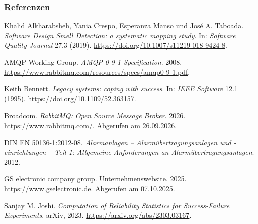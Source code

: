 \documentclass[11pt,aspectratio=1610]{beamer} %
\begin{document}
\begin{frame}
    \frametitle{Referenzen}
    \fontsize{7pt}{8pt}\selectfont
    \begin{reflist}
        \hypertarget{Alk19}{}
        \item[{[Alk19]}] Khalid Alkharabsheh, Yania Crespo, Esperanza Manso und José A. Taboada. \textit{Software Design Smell Detection: a systematic mapping study}. In: \textit{Software Quality Journal} 27.3 (2019). \url{https://doi.org/10.1007/s11219-018-9424-8}.

        \hypertarget{AMQ08}{}
        \item[{[AMQ08]}] AMQP Working Group. \textit{AMQP 0-9-1 Specification}. 2008. \url{https://www.rabbitmq.com/resources/specs/amqp0-9-1.pdf}.

        \hypertarget{Ben95}{}
        \item[{[Ben95]}] Keith Bennett. \textit{Legacy systems: coping with success}. In: \textit{IEEE Software} 12.1 (1995). \url{https://doi.org/10.1109/52.363157}.

        \hypertarget{Bro26}{}
        \item[{[Bro26]}] Broadcom. \textit{RabbitMQ: Open Source Message Broker}. 2026. \url{https://www.rabbitmq.com/}. Abgerufen am 26.09.2026.

        \hypertarget{DIN12}{}
        \item[{[DIN12]}] DIN EN 50136-1:2012-08. \textit{Alarmanlagen -- Alarmübertragungsanlagen und -einrichtungen -- Teil 1: Allgemeine Anforderungen an Alarmübertragungsanlagen}. 2012.

        \hypertarget{GS25}{}
        \item[{[GS25]}] GS electronic company group. Unternehmenswebsite. 2025. \url{https://www.gselectronic.de}. Abgerufen am 07.10.2025.


        \hypertarget{Jos23}{}
        \item[{[Jos23]}] Sanjay M. Joshi. \textit{Computation of Reliability Statistics for Success-Failure Experiments}. arXiv, 2023. \url{https://arxiv.org/abs/2303.03167}.


\end{reflist}
\end{frame}
\end{document}
